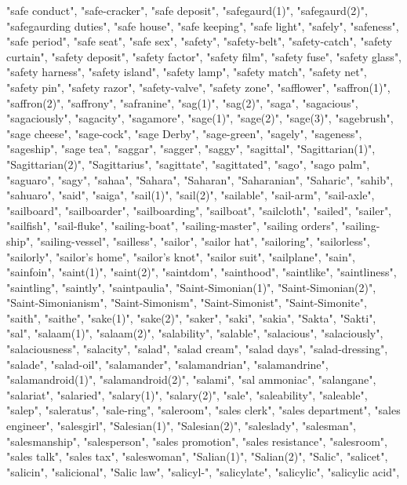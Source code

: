 "safe conduct",
"safe-cracker",
"safe deposit",
"safegaurd(1)",
"safegaurd(2)",
"safegaurding duties",
"safe house",
"safe keeping",
"safe light",
"safely",
"safeness",
"safe period",
"safe seat",
"safe sex",
"safety",
"safety-belt",
"safety-catch",
"safety curtain",
"safety deposit",
"safety factor",
"safety film",
"safety fuse",
"safety glass",
"safety harness",
"safety island",
"safety lamp",
"safety match",
"safety net",
"safety pin",
"safety razor",
"safety-valve",
"safety zone",
"safflower",
"saffron(1)",
"saffron(2)",
"saffrony",
"safranine",
"sag(1)",
"sag(2)",
"saga",
"sagacious",
"sagaciously",
"sagacity",
"sagamore",
"sage(1)",
"sage(2)",
"sage(3)",
"sagebrush",
"sage cheese",
"sage-cock",
"sage Derby",
"sage-green",
"sagely",
"sageness",
"sageship",
"sage tea",
"saggar",
"sagger",
"saggy",
"sagittal",
"Sagittarian(1)",
"Sagittarian(2)",
"Sagittarius",
"sagittate",
"sagittated",
"sago",
"sago palm",
"saguaro",
"sagy",
"sahaa",
"Sahara",
"Saharan",
"Saharanian",
"Saharic",
"sahib",
"sahuaro",
"said",
"saiga",
"sail(1)",
"sail(2)",
"sailable",
"sail-arm",
"sail-axle",
"sailboard",
"sailboarder",
"sailboarding",
"sailboat",
"sailcloth",
"sailed",
"sailer",
"sailfish",
"sail-fluke",
"sailing-boat",
"sailing-master",
"sailing orders",
"sailing-ship",
"sailing-vessel",
"sailless",
"sailor",
"sailor hat",
"sailoring",
"sailorless",
"sailorly",
"sailor's home",
"sailor's knot",
"sailor suit",
"sailplane",
"sain",
"sainfoin",
"saint(1)",
"saint(2)",
"saintdom",
"sainthood",
"saintlike",
"saintliness",
"saintling",
"saintly",
"saintpaulia",
"Saint-Simonian(1)",
"Saint-Simonian(2)",
"Saint-Simonianism",
"Saint-Simonism",
"Saint-Simonist",
"Saint-Simonite",
"saith",
"saithe",
"sake(1)",
"sake(2)",
"saker",
"saki",
"sakia",
"Sakta",
"Sakti",
"sal",
"salaam(1)",
"salaam(2)",
"salability",
"salable",
"salacious",
"salaciously",
"salaciousness",
"salacity",
"salad",
"salad cream",
"salad days",
"salad-dressing",
"salade",
"salad-oil",
"salamander",
"salamandrian",
"salamandrine",
"salamandroid(1)",
"salamandroid(2)",
"salami",
"sal ammoniac",
"salangane",
"salariat",
"salaried",
"salary(1)",
"salary(2)",
"sale",
"saleability",
"saleable",
"salep",
"saleratus",
"sale-ring",
"saleroom",
"sales clerk",
"sales department",
"sales engineer",
"salesgirl",
"Salesian(1)",
"Salesian(2)",
"saleslady",
"salesman",
"salesmanship",
"salesperson",
"sales promotion",
"sales resistance",
"salesroom",
"sales talk",
"sales tax",
"saleswoman",
"Salian(1)",
"Salian(2)",
"Salic",
"salicet",
"salicin",
"salicional",
"Salic law",
"salicyl-",
"salicylate",
"salicylic",
"salicylic acid",
